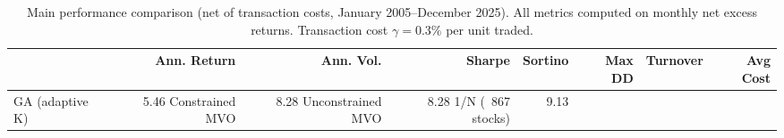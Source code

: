 \begin{table}
\caption{Main performance comparison (net of transaction costs, January 2005--December 2025). All metrics computed on monthly net excess returns. Transaction cost $\gamma = 0.3\%$ per unit traded.}
\label{tab:performance}
\begin{tabular}{lrrrrrrr}
\toprule
 & Ann. Return & Ann. Vol. & Sharpe & Sortino & Max DD & Turnover & Avg Cost \\
\midrule
GA (adaptive K) & 5.46%
Constrained MVO & 8.28%
Unconstrained MVO & 8.28%
1/N (~867 stocks) & 9.13%
\bottomrule
\end{tabular}
\end{table}
